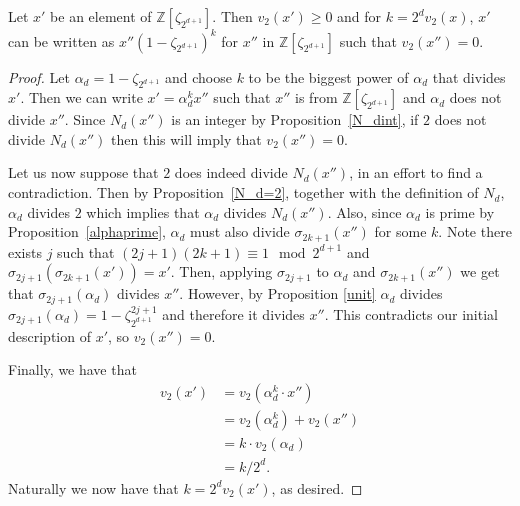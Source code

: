\documentclass[12pt]{dalthesis}
\begin{document}
\begin{proposition}
\label{propA.22}
Let $x'$ be an element of $\mathbb{Z}[\zeta_{2^{d+1}}]$. Then $v_2(x') \geq 0$ and for $k=2^d v_2(x)$, $x'$ can be written as $x''(1-\zeta_{2^{d+1}})^k$ for $x''$ in $\mathbb{Z}[\zeta_{2^{d+1}}]$ such that $v_2(x'') = 0$.
\end{proposition}
\begin{proof}
Let $\alpha_d = 1-\zeta_{2^{d+1}}$ and choose $k$ to be the biggest power of $\alpha_d$ that divides $x'$. Then we can write $x' = \alpha_d^k x''$ such that $x''$ is from $\mathbb{Z}[\zeta_{2^{d+1}}]$ and $\alpha_d$ does not divide $x''$. Since $N_d(x'')$ is an integer by Proposition~\ref{N_dint}, if $2$ does not divide $N_d(x'')$ then this will imply that $v_2(x'') = 0$. 

Let us now suppose that $2$ does indeed divide $N_d(x'')$, in an effort to find a contradiction. Then by Proposition~\ref{N_d=2}, together with the definition of $N_d$, $\alpha_d$ divides $2$ which implies that $\alpha_d$ divides $N_d(x'')$. Also, since $\alpha_d$ is prime by Proposition~\ref{alphaprime}, $\alpha_d$ must also divide $\sigma_{2k+1}(x'')$ for some $k$. Note there exists $j$ such that $(2j+1)(2k+1) \equiv 1 \mod 2^{d+1}$ and $\sigma_{2j+1}(\sigma_{2k+1}(x')) = x'$. Then, applying $\sigma_{2j+1}$ to $\alpha_d$ and $\sigma_{2k+1}(x'')$ we get that $\sigma_{2j+1}(\alpha_d)$ divides $x''$. However, by Proposition \ref{unit} $\alpha_d$ divides $\sigma_{2j+1}(\alpha_d) = 1 - \zeta_{2^{d+1}}^{2j+1}$ and therefore it divides $x''$. This contradicts our initial description of $x'$, so $v_2(x'') = 0$. 

Finally, we have that 
\begin{align*}
v_2 (x') & = v_2(\alpha_d^k \cdot x'') \\
& = v_2 (\alpha_d^k) + v_2(x'') \\
& = k \cdot v_2 (\alpha_d) \\
& = k/2^d.
\end{align*}
Naturally we now have that $k = 2^d  v_2(x')$, as desired. \qedhere
   
\end{proof}
\end{document}

